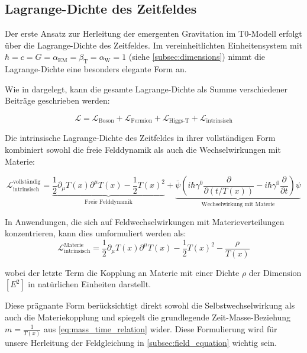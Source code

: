 \documentclass[12pt,a4paper]{article}
\newcommand{\Tfield}{T(x)}
\newcommand{\betaT}{\beta_{\text{T}}}
\newcommand{\alphaEM}{\alpha_{\text{EM}}}
\newcommand{\alphaW}{\alpha_{\text{W}}}
\begin{document}
	\subsection{Lagrange-Dichte des Zeitfeldes}
	\label{subsec:lagrangian_density}
	Der erste Ansatz zur Herleitung der emergenten Gravitation im T0-Modell erfolgt über die Lagrange-Dichte des Zeitfeldes. Im vereinheitlichten Einheitensystem mit \(\hbar = c = G = \alphaEM = \betaT = \alphaW = 1\) (siehe \cref{subsec:dimensions}) nimmt die Lagrange-Dichte eine besonders elegante Form an.
	
	Wie in \cite{pascher_lagrange_2025,pascher_messdifferenzen_2025} dargelegt, kann die gesamte Lagrange-Dichte als Summe verschiedener Beiträge geschrieben werden:
	
	\begin{equation}
		\label{eq:total_lagrangian}
		\mathcal{L} = \mathcal{L}_{\text{Boson}} + \mathcal{L}_{\text{Fermion}} + \mathcal{L}_{\text{Higgs-T}} + \mathcal{L}_{\text{intrinsisch}}
	\end{equation}
	
	Die intrinsische Lagrange-Dichte des Zeitfeldes in ihrer vollständigen Form kombiniert sowohl die freie Felddynamik als auch die Wechselwirkungen mit Materie:
	
	\begin{equation}
		\label{eq:intrinsic_lagrangian_complete}
		\mathcal{L}_{\text{intrinsisch}}^{\text{vollständig}} = \underbrace{\frac{1}{2} \partial_\mu \Tfield \partial^\mu \Tfield - \frac{1}{2}\Tfield^2}_{\text{Freie Felddynamik}} + \underbrace{\bar{\psi} \left( i\hbar \gamma^0 \frac{\partial}{\partial (t/\Tfield)} - i\hbar \gamma^0 \frac{\partial}{\partial t} \right) \psi}_{\text{Wechselwirkung mit Materie}}
	\end{equation}
	
	In Anwendungen, die sich auf Feldwechselwirkungen mit Materieverteilungen konzentrieren, kann dies umformuliert werden als:
	\begin{equation}
		\label{eq:intrinsic_lagrangian_matter}
		\mathcal{L}_{\text{intrinsisch}}^{\text{Materie}} = \frac{1}{2} \partial_\mu \Tfield \partial^\mu \Tfield - \frac{1}{2}\Tfield^2 - \frac{\rho}{\Tfield}
	\end{equation}
	
	wobei der letzte Term die Kopplung an Materie mit einer Dichte $\rho$ der Dimension $[E^2]$ in natürlichen Einheiten darstellt.
	
	Diese prägnante Form berücksichtigt direkt sowohl die Selbstwechselwirkung als auch die Materiekopplung und spiegelt die grundlegende Zeit-Masse-Beziehung \(m = \frac{1}{\Tfield}\) aus \cref{eq:mass_time_relation} wider. Diese Formulierung wird für unsere Herleitung der Feldgleichung in \cref{subsec:field_equation} wichtig sein.
	
\end{document}
